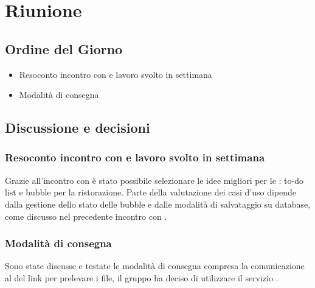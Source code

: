 \section{Riunione}
\subsection{Ordine del Giorno}
\begin{itemize}
	\item Resoconto incontro con \Proponente e lavoro svolto in settimana 
	\item Modalità di consegna
\end{itemize}

\subsection{Discussione e decisioni}
\subsubsection{Resoconto incontro con \Proponente e lavoro svolto in settimana}
Grazie all'incontro con \Proponente è stato possibile selezionare le idee migliori per le : to-do list e bubble per la ristorazione. Parte della valutazione dei casi d'uso dipende dalla gestione dello stato delle bubble e dalle modalità di salvataggio su database, come discusso nel precedente incontro con \Proponente. 

\subsubsection{Modalità di consegna}
Sono state discusse e testate le modalità di consegna compresa la comunicazione al \Committente{} del link per prelevare i file, il gruppo ha deciso di utilizzare il servizio . 

\clearpage
